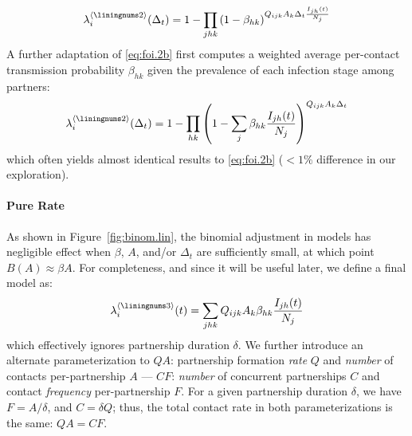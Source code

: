 \begin{equation}\label{eq:foi.2b}
  \lambda_i^{\case{2}}(\Delta_t) =
  1 - \prod_{jhk}{\left(1 - \beta_{hk}\right)}^{Q_{ijk} A_k \Delta_t \frac{I_{jh}(t)}{N_j}}
\end{equation}
A further adaptation of \eqref{eq:foi.2b} first computes
a weighted average per-contact transmission probability $\beta_{hk}$
given the prevalence of each infection stage among partners:
\begin{equation}\label{eq:foi.2c}
  \lambda_i^{\case{2}}(\Delta_t) =
  1 - \prod_{hk}{\left(1 - \sum_j \beta_{hk}\frac{I_{jh}(t)}{N_j}\right)}^{Q_{ijk} A_k \Delta_t}
\end{equation}
which often yields almost identical results to \eqref{eq:foi.2b}
($<1\%$ difference in our exploration).
\paragraph{ Pure Rate}
As shown in Figure~\ref{fig:binom.lin}, the binomial adjustment in models 
has negligible effect when $\beta$, $A$, and/or $\Delta_t$ are sufficiently small,
at which point $B(A) \approx \beta A$.
For completeness, and since it will be useful later, we define a final model  as:
\begin{equation}\label{eq:foi.3}
  \lambda_i^{\case{3}}(t) = \sum_{jhk} Q_{ijk} A_k \beta_{hk} \frac{I_{jh}(t)}{N_j}
\end{equation}
which effectively ignores partnership duration $\delta$.
We further introduce an alternate parameterization to
$QA$: partnership formation \emph{rate} $Q$ and \emph{number} of contacts per-partnership $A$ ---
$CF$: \emph{number} of concurrent partnerships $C$ and contact \emph{frequency} per-partnership $F$.
For a given partnership duration $\delta$, we have $F = A/\delta$, and $C = \delta Q$;
thus, the total contact rate in both parameterizations is the same: $QA = CF$.
